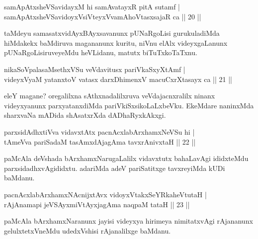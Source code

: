 \begin{shl}
samApAtxsheVSavidayxM hi samAvatayxR pitA sutamf | \\
samApAtxsheVSavidoyxV\s siVteyxVvamAhoVtasxsajaR ca \hfill|| 20 || 
\end{shl}

\begin{artha}
taMdeyu samasatxvidAyxBAyxsavanunx pUNaRgoLisi gurukuladiMda 
hiMdakekx baMdiruva magananunx kuritu, niVnu elAlx videyxgaLanunx 
pUNaRgoLisiruveyeMdu heVLidanu, matutx biTuTxkoTaTxnu. 
\end{artha}


\begin{shl}
nikaSoVpalasaMsethxVSu veVdavitusx pariVkaSxyXtAmf | \\
videyxVyaM yatanxtoV vatasx darxDhimenxV macuCxrXtasayx ca \hfill|| 21 || 
\end{shl}

\begin{artha}
eleY magane? oregalilxna sAthxnadalilxruva veVdajacnxralilx ninanx 
videyxyanunx parxyatanxdiMda pariVkiSxsikoLaLxbeVku. EkeMdare 
naninxMda sharxvaNa mADida shAsatxrXda dADhaRyxkAkxgi.
\end{artha}


\begin{shl}
parxsidAdhx\s tiVva vidavxtAtx pacnAcxlabArxhamxNeVSu hi | \\
tAmeVva pariSadaM tasAmxdAjagAma tavxrAnivxtaH \hfill|| 22 || 
\end{shl}

\begin{artha}
paMcAla deVshada bArxhamxNarugaLalilx vidavxtutx bahaLavAgi ididxteMdu 
parxsidadhxvAgididxtu. adariMda adeV pariSatitxge tavxreyiMda kUDi 
baMdanu.
\end{artha}


\begin{shl}
pacnAcxlabArxhamxNAcnijxtAvx vidoyxVtakxSeYRkaheVtutaH | \\
rAjAnamapi jeVSAyxmiVtAyxjagAma naqpaM tataH \hfill|| 23 || 
\end{shl}

\begin{artha}
paMcAla bArxhamxNaranunx jayisi videyxya hirimeya nimitatxvAgi 
rAjananunx gelulxtetxVneMdu udedxVshisi rAjanalilxge baMdanu.
\end{artha}

